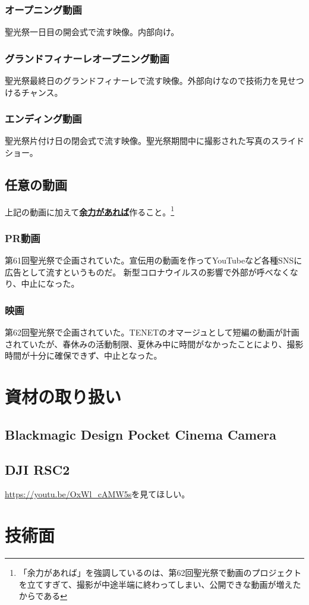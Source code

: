 \documentclass[dvipdfmx,jb5]{jreport}
\newcommand{\impact}[1]{\textbf{\gtfamily #1}}
\begin{document}
\subsubsection{オープニング動画}
聖光祭一日目の開会式で流す映像。内部向け。
\subsubsection{グランドフィナーレオープニング動画}
聖光祭最終日のグランドフィナーレで流す映像。外部向けなので技術力を見せつけるチャンス。
\subsubsection{エンディング動画}
聖光祭片付け日の閉会式で流す映像。聖光祭期間中に撮影された写真のスライドショー。
\subsection{任意の動画}
上記の動画に加えて\underline{\impact{余力があれば}}作ること。\footnote{「余力があれば」を強調しているのは、第62回聖光祭で動画のプロジェクトを立てすぎて、撮影が中途半端に終わってしまい、公開できな動画が増えたからである}
\subsubsection{PR動画}
第61回聖光祭で企画されていた。宣伝用の動画を作ってYouTubeなど各種SNSに広告として流すというものだ。
新型コロナウイルスの影響で外部が呼べなくなり、中止になった。
\subsubsection{映画}
第62回聖光祭で企画されていた。TENETのオマージュとして短編の動画が計画されていたが、春休みの活動制限、夏休み中に時間がなかったことにより、撮影時間が十分に確保できず、中止となった。
\section{資材の取り扱い}
\subsection{Blackmagic Design Pocket Cinema Camera}
\subsection{DJI RSC2}
\url{https://youtu.be/OxWl_cAMW5s}を見てほしい。

\section{技術面}
\end{document}
